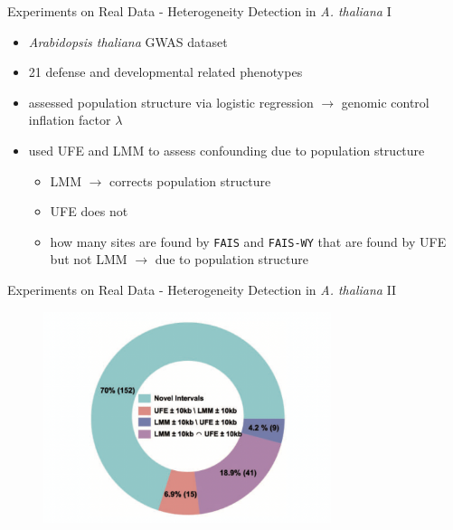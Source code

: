 \documentclass[aspectratio=32, 10pt]{beamer}
\begin{document}
\begin{frame}[fragile]{Experiments on Real Data - Heterogeneity Detection in \textit{A. thaliana} I }
\begin{itemize}
    \item \textit{Arabidopsis thaliana} GWAS dataset
    \item 21 defense and developmental related phenotypes
    \item assessed population structure via logistic regression $\rightarrow$ genomic control inflation factor $\lambda$
    \item used UFE and LMM to assess confounding due to population structure
    \begin{itemize}
        \item LMM $\rightarrow$ corrects population structure
        \item UFE does not
        \item how many sites are found by \texttt{FAIS} and \texttt{FAIS-WY} that are found by UFE but not LMM $\rightarrow$ due to population structure
    \end{itemize}
\end{itemize}
\end{frame}

\begin{frame}[fragile]{Experiments on Real Data - Heterogeneity Detection in \textit{A. thaliana} II }
\begin{figure}
    \centering
    \includegraphics[width=0.75\textwidth]{figures/novel_intervals.png}
\end{figure}
\end{frame}
\end{document}
